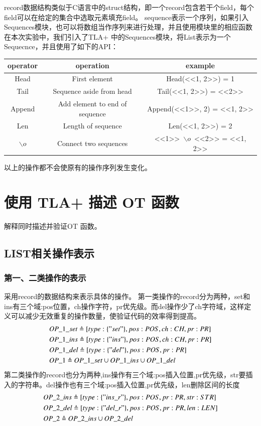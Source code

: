 record数据结构类似于C语言中的struct结构，即一个record包含若干个field，每个field可以在给定的集合中选取元素填充field。
sequence表示一个序列，如果引入Sequences模块，也可以将数组当作序列来进行处理，并且使用模块里的相应函数
在本次实验中，我们引入了TLA+ 中的Sequences模块，将List表示为一个Sequecnce，并且使用了如下的API：\\
\begin{tabular}{ccc}
\hline
operator& operation& example \\
\hline  
 Head& First element &Head(<<1, 2>>) = 1\\
 Tail& Sequence aside from head &Tail(<<1, 2>>) = <<2>>\\
 Append& Add element to end of sequence &Append(<<1>>, 2) = <<1, 2>>\\ 
 Len& Length of sequence &Len(<<1, 2>>) = 2\\
 $\backslash o$& Connect two sequences &<<1>>\ $\backslash o$\ <<2>> = <<1, 2>>\\
\hline %
\end{tabular}
\par 以上的操作都不会使原有的操作序列发生变化。

\section{使用 TLA+ 描述 OT 函数}
解释同时描述并验证OT 函数。	 	
\subsection{LIST相关操作表示}
\subsubsection{第一、二类操作的表示}
采用record的数据结构来表示具体的操作。
第一类操作的record分为两种，set和ins有三个域:pos位置，ch操作字符，pr优先级。而del操作少了ch字符域，这样定义可以减少无效重复的操作数量，使验证代码的效率得到提高。
\begin{align*}
&OP\_1\_set \triangleq [type: \{"set"\}, pos: POS, ch: CH, pr:PR] \\
&OP\_1\_ins \triangleq [type: \{"ins"\}, pos: POS, ch: CH, pr:PR] \\
&OP\_1\_del \triangleq [type: \{"del"\}, pos: POS, pr:PR] \\
&OP\_1 \triangleq OP\_1\_set \cup OP\_1\_ins \cup OP\_1\_del
\end{align*}
第二类操作的record也分为两种,ins操作有三个域:pos插入位置,pr优先级，str要插入的字符串。del操作也有三个域:pos插入位置,pr优先级，len删除区间的长度
\begin{align*}
&OP\_2\_ins \triangleq [type: \{"ins\_r"\}, pos: POS, pr:PR, str:STR] \\
&OP\_2\_del \triangleq [type: \{"del\_r"\}, pos: POS, pr:PR, len:LEN] \\
&OP\_2 \triangleq  OP\_2\_ins \cup OP\_2\_del 
\end{align*}

